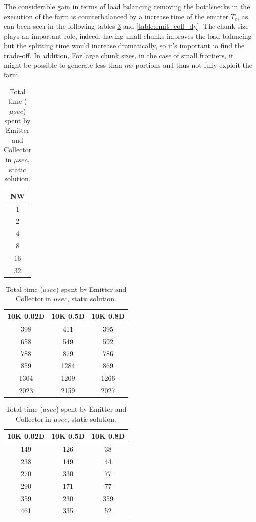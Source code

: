 The considerable gain in terms of load balancing removing the bottlenecks in the execution of the farm is counterbalanced by a increase time of the emitter $T_e$, as can been seen in the following tables \ref{table:emit_coll} and \ref{table:emit_coll_dy}. The chunk size plays an important role, indeed, having small chunks improves the load balancing but the splitting time would increase dramatically, so it's important to find the trade-off. In addition, For large chunk sizes, in the case of small frontiers, it might be possible to generate less than $nw$ portions and thus not fully exploit the farm.

\begin{table}[!htb]
\centering
\begin{minipage}{0.08\textwidth}
\centering
\begin{tabular}{|c|}
\hline
NW \\ \hline
1          \\ \hline
2      \\ \hline
4           \\ \hline
8            \\ \hline
16       \\ \hline
32          \\ \hline
\end{tabular}
\end{minipage}
\begin{minipage}{0.43\textwidth}
\centering
\begin{tabular}{|c|c|c|}
\hline
 10K 0.02D & 10K 0.5D & 10K 0.8D \\ \hline
 398       & 411      & 395      \\ \hline
658       & 549     & 592       \\ \hline
 788      & 879      & 786      \\ \hline
 859      & 1284     & 869     \\ \hline
 1304      & 1209      & 1266 \\ \hline
 2023      & 2159     & 2027 \\ \hline
\end{tabular}

\end{minipage}
\begin{minipage}{0.43\textwidth}
\centering
\begin{tabular}{|c|c|c|}
\hline
 10K 0.02D & 10K 0.5D & 10K 0.8D \\ \hline
149       & 126      & 38       \\ \hline
238       & 149      & 44      \\ \hline
270       & 330      & 77       \\ \hline
290       & 171      & 77       \\ \hline
359       & 230      & 359      \\ \hline
461       & 335      & 52       \\ \hline
\end{tabular}
\end{minipage}
\caption{Total time ($\mu sec$) spent by Emitter and Collector in $\mu sec$, static solution.}
\label{table:emit_coll}
\end{table}

